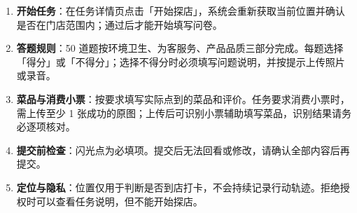 \documentclass[12pt,a4paper,fontset=none]{ctexart}
\begin{document}
\begin{enumerate}
\item \textbf{开始任务}：在任务详情页点击「开始探店」，系统会重新获取当前位置并确认是否在门店范围内；通过后才能开始填写问卷。
\item \textbf{答题规则}：50 道题按环境卫生、为客服务、产品品质三部分完成。每题选择「得分」或「不得分」；选择不得分时必须填写问题说明，并按提示上传照片或录音。
\item \textbf{菜品与消费小票}：按要求填写实际点到的菜品和评价。任务要求消费小票时，需上传至少 1 张成功的原图；上传后可识别小票辅助填写菜品，识别结果请务必逐项核对。
\item \textbf{提交前检查}：闪光点为必填项。提交后无法回看或修改，请确认全部内容后再提交。
\item \textbf{定位与隐私}：位置仅用于判断是否到店打卡，不会持续记录行动轨迹。拒绝授权时可以查看任务说明，但不能开始探店。
\end{enumerate}
\end{document}
